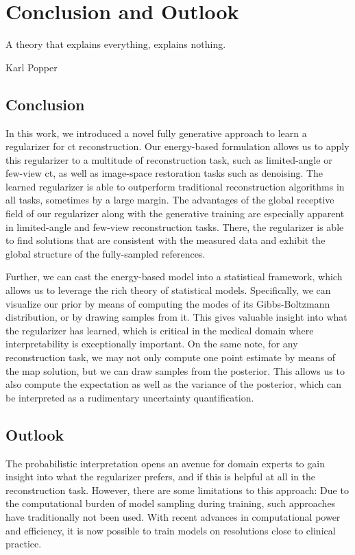 \documentclass[../ml-tct.tex]{subfiles}
\begin{document}
\chapter{Conclusion and Outlook}%
\label{chap:conclusion}
\epigraph{A theory that explains everything, explains nothing.}{Karl Popper}

\minitoc%
\section{Conclusion}
In this work, we introduced a novel fully generative approach to learn a regularizer for \gls{ct} reconstruction.
Our energy-based formulation allows us to apply this regularizer to a multitude of reconstruction task, such as limited-angle or few-view \gls{ct}, as well as image-space restoration tasks such as denoising.
The learned regularizer is able to outperform traditional reconstruction algorithms in all tasks, sometimes by a large margin.
The advantages of the global receptive field of our regularizer along with the generative training are especially apparent in limited-angle and few-view reconstruction tasks.
There, the regularizer is able to find solutions that are consistent with the measured data and exhibit the global structure of the fully-sampled references.

Further, we can cast the energy-based model into a statistical framework, which allows us to leverage the rich theory of statistical models.
Specifically, we can visualize our prior by means of computing the modes of its Gibbs-Boltzmann distribution, or by drawing samples from it.
This gives valuable insight into what the regularizer has learned, which is critical in the medical domain where interpretability is exceptionally important.
On the same note, for any reconstruction task, we may not only compute one point estimate by means of the \gls{map} solution, but we can draw samples from the posterior.
This allows us to also compute the expectation as well as the variance of the posterior, which can be interpreted as a rudimentary uncertainty quantification.
\section{Outlook}
The probabilistic interpretation opens an avenue for domain experts to gain insight into what the regularizer prefers, and if this is helpful at all in the reconstruction task.
However, there are some limitations to this approach:
Due to the computational burden of model sampling during training, such approaches have traditionally not been used.
With recent advances in computational power and efficiency, it is now possible to train models on resolutions close to clinical practice.
\end{document}
